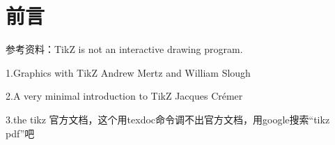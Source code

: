 \documentclass[11pt,oneside]{book}
\begin{document}
\frontmatter

\author{万泽}
\titleLB

\chapter*{前言}
\begin{common-format}
参考资料：TikZ is not an interactive drawing program.

1.Graphics with TikZ Andrew Mertz and William Slough

2.A very minimal introduction to TikZ Jacques Crémer

3.the tikz 官方文档，这个用texdoc命令调不出官方文档，用google搜索“tikz pdf”吧

\end{common-format}


\setcounter{tocdepth}{2}
\tableofcontents
\end{document}
